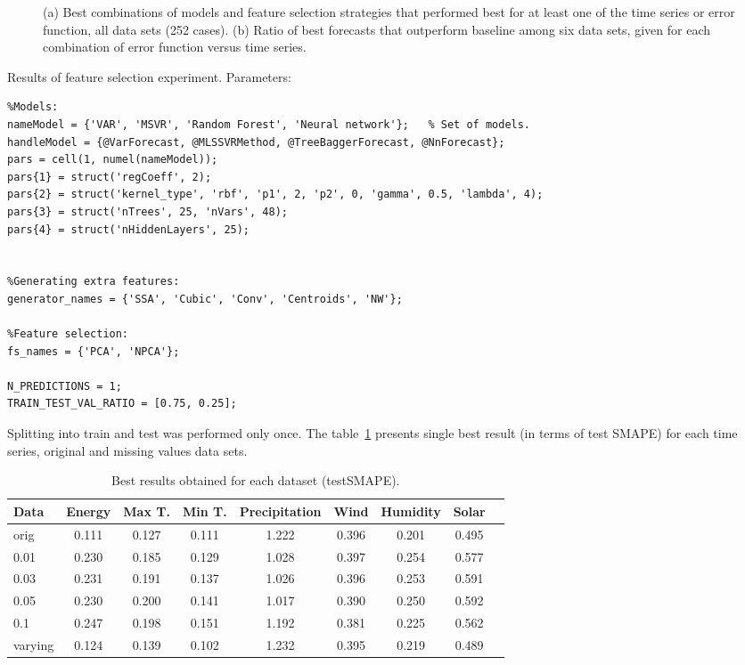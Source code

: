 \documentclass[12pt]{article}
\begin{document}
\begin{figure}
\centering
{}
\caption{(a) Best combinations of models and feature selection strategies that performed best for at least one of the time series or error function, all data sets (252 cases). (b) Ratio of best forecasts that outperform baseline among six data sets, given for each combination of error function versus time series.}
\end{figure}

Results of feature selection experiment.
Parameters:
\begin{verbatim}
%Models:
nameModel = {'VAR', 'MSVR', 'Random Forest', 'Neural network'};   % Set of models.
handleModel = {@VarForecast, @MLSSVRMethod, @TreeBaggerForecast, @NnForecast};
pars = cell(1, numel(nameModel));
pars{1} = struct('regCoeff', 2);
pars{2} = struct('kernel_type', 'rbf', 'p1', 2, 'p2', 0, 'gamma', 0.5, 'lambda', 4);
pars{3} = struct('nTrees', 25, 'nVars', 48);
pars{4} = struct('nHiddenLayers', 25);


%Generating extra features:
generator_names = {'SSA', 'Cubic', 'Conv', 'Centroids', 'NW'};

%Feature selection:
fs_names = {'PCA', 'NPCA'};

N_PREDICTIONS = 1;
TRAIN_TEST_VAL_RATIO = [0.75, 0.25];
\end{verbatim}
Splitting into train and test was performed only once. The table~\ref{tb:best_res} presents single best result (in terms of test SMAPE) for each time series, original and missing values data sets.


\begin{table}
\begin{tabular}{|p{2cm}|c|c|c|c|c|c|c|c|}
\hline
Data &Energy & Max T. & Min T. & Precipitation & Wind & Humidity & Solar\\
\hline
\multirow{1}{*}{orig} &   0.111 &    0.127 &    0.111 &    1.222 &    0.396 &    0.201 &    0.495\\
\cline{1-7}
\hline
\multirow{1}{*}{0.01} &   0.230 &    0.185 &    0.129 &    1.028 &    0.397 &    0.254 &    0.577\\
\cline{1-7}
\hline
\multirow{1}{*}{0.03} &   0.231 &    0.191 &    0.137 &    1.026 &    0.396 &    0.253 &    0.591\\
\cline{1-7}
\hline
\multirow{1}{*}{0.05} &   0.230 &    0.200 &    0.141 &    1.017 &    0.390 &    0.250 &    0.592\\
\cline{1-7}
\hline
\multirow{1}{*}{0.1} &   0.247 &    0.198 &    0.151 &    1.192 &    0.381 &    0.225 &    0.562\\
\cline{1-7}
\hline
\multirow{1}{*}{varying} &   0.124 &    0.139 &    0.102 &    1.232 &    0.395 &    0.219 &    0.489\\
\cline{1-7}
\hline
\end{tabular}\caption{Best results obtained for each dataset (testSMAPE).}\label{tb:best_res}
\end{table}
\end{document}
